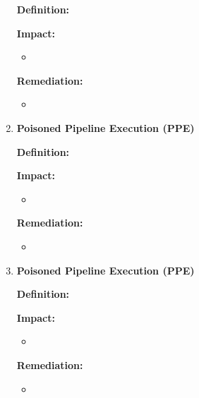 \begin{enumerate}[label=(\arabic*)]
    \textbf{Definition: }

    \textbf{Impact: }
        \begin{itemize}
            \item
        \end{itemize}
    \textbf{Remediation:}
        \begin{itemize}
            \item
        \end{itemize}
    \item \textbf{Poisoned Pipeline Execution (PPE)}

    \textbf{Definition: }

    \textbf{Impact: }
        \begin{itemize}
            \item
        \end{itemize}
    \textbf{Remediation:}
        \begin{itemize}
            \item
        \end{itemize}
    \item \textbf{Poisoned Pipeline Execution (PPE)}

    \textbf{Definition: }

    \textbf{Impact: }
        \begin{itemize}
            \item
        \end{itemize}
    \textbf{Remediation:}
        \begin{itemize}
            \item
        \end{itemize}
\end{enumerate}



